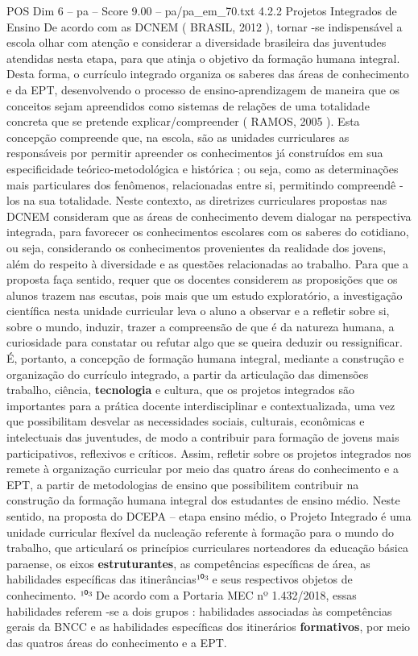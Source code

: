 \begin{textsample}{POS Dim 6 – pa – Score 9.00 – pa/pa\_em\_70.txt}  \label{ex:f6_pos_068}
4.2.2 Projetos Integrados de Ensino De acordo com as DCNEM ( BRASIL, 2012 ), tornar -se indispensável a escola olhar com atenção e considerar a diversidade brasileira das juventudes atendidas nesta etapa, para que atinja o objetivo da formação humana integral.
Desta forma, o currículo integrado organiza os saberes das áreas de conhecimento e da EPT, desenvolvendo o processo de ensino-aprendizagem de maneira que os conceitos sejam apreendidos como sistemas de relações de uma totalidade concreta que se pretende explicar/compreender ( RAMOS, 2005 ).
Esta concepção compreende que, na escola, são as unidades curriculares as responsáveis por permitir apreender os conhecimentos já construídos em sua especificidade teórico-metodológica e histórica ; ou seja, como as determinações mais particulares dos fenômenos, relacionadas entre si, permitindo compreendê -los na sua totalidade.
Neste contexto, as diretrizes curriculares propostas nas DCNEM consideram que as áreas de conhecimento devem dialogar na perspectiva integrada, para favorecer os conhecimentos escolares com os saberes do cotidiano, ou seja, considerando os conhecimentos provenientes da realidade dos jovens, além do respeito à diversidade e as questões relacionadas ao trabalho.
Para que a proposta faça sentido, requer que os docentes considerem as proposições que os alunos trazem nas escutas, pois mais que um estudo exploratório, a investigação científica nesta unidade curricular leva o aluno a observar e a refletir sobre si, sobre o mundo, induzir, trazer a compreensão de que é da natureza humana, a curiosidade para constatar ou refutar algo que se queira deduzir ou ressignificar.
É, portanto, a concepção de formação humana integral, mediante a construção e organização do currículo integrado, a partir da articulação das dimensões trabalho, ciência, \textbf{tecnologia} e cultura, que os projetos integrados são importantes para a prática docente interdisciplinar e contextualizada, uma vez que possibilitam desvelar as necessidades sociais, culturais, econômicas e intelectuais das juventudes, de modo a contribuir para formação de jovens mais participativos, reflexivos e críticos.
Assim, refletir sobre os projetos integrados nos remete à organização curricular por meio das quatro áreas do conhecimento e a EPT, a partir de metodologias de ensino que possibilitem contribuir na construção da formação humana integral dos estudantes de ensino médio.
Neste sentido, na proposta do DCEPA – etapa ensino médio, o Projeto Integrado é uma unidade curricular flexível da nucleação referente à formação para o mundo do trabalho, que articulará os princípios curriculares norteadores da educação básica paraense, os eixos \textbf{estruturantes}, as competências específicas de área, as habilidades específicas das itinerâncias¹⁰³ e seus respectivos objetos de conhecimento. ¹⁰³ De acordo com a Portaria MEC nº 1.432/2018, essas habilidades referem -se a dois grupos : habilidades associadas às competências gerais da BNCC e as habilidades específicas dos itinerários \textbf{formativos}, por meio das quatros áreas do conhecimento e a EPT.

\end{textsample}
